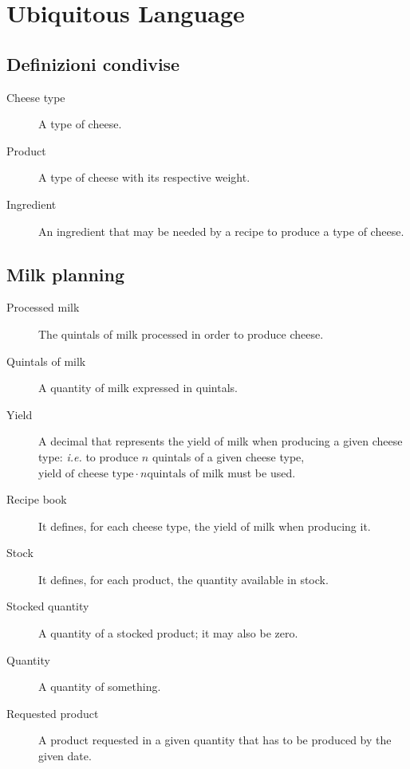 \chapter{Ubiquitous Language}
\label{app:ubiquitous-language}

\section{Definizioni condivise}
\begin{description}
    \item[Cheese type] A type of cheese.
    \item[Product] A type of cheese with its respective weight.
    \item[Ingredient] An ingredient that may be needed by a recipe to produce a type of cheese.
\end{description}


\section{Milk planning}
\begin{description}
    \item [Processed milk] The quintals of milk processed in order to produce cheese.
    \item [Quintals of milk] A quantity of milk expressed in quintals.
    \item [Yield] A decimal that represents the yield of milk when producing a given cheese type: \textit{i.e.} to produce $n$ quintals of a given cheese type, $\text{yield of cheese type} \cdot n \text{quintals of milk}$ must be used.
    \item [Recipe book] It defines, for each cheese type, the yield of milk when producing it.
    \item [Stock] It defines, for each product, the quantity available in stock.
    \item [Stocked quantity] A quantity of a stocked product; it may also be zero.
    \item [Quantity] A quantity of something.
    \item [Requested product] A product requested in a given quantity that has to be produced by the given date.
\end{description}

